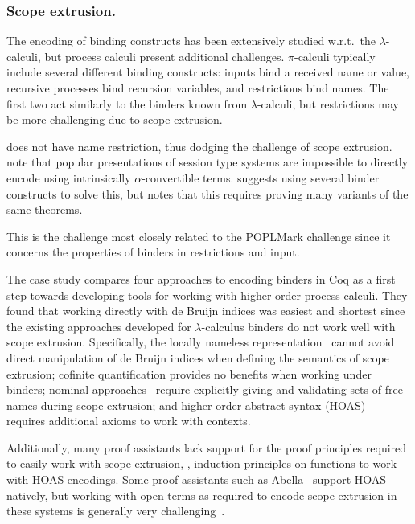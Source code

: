 \documentclass[runningheads]{llncs}
\begin{document}
\subsubsection{Scope extrusion.}

The encoding of binding constructs has been extensively studied
w.r.t.\ the $\lambda$-calculi, but process calculi present additional
challenges.  $\pi$-calculi typically include several different binding
constructs: inputs bind a received name or value, recursive processes
bind recursion variables, and restrictions bind names.  The first two
act similarly to the binders known from $\lambda$-calculi, but
restrictions may be more challenging due to scope extrusion.

\cite{Maksimovic2015} does not have name restriction, thus dodging the challenge of scope extrusion.
\cite{Castro-Perez2021,Castro2020} note that popular presentations of session type systems are impossible to directly encode using intrinsically \(\alpha\)-convertible terms.
\cite{Castro2020} suggests using several binder constructs to solve this, but notes that this requires proving many variants of the same theorems.


This is the challenge most closely related to the POPLMark challenge
since it concerns the properties of binders in restrictions and input.

The case study \cite{AmbalLS21} compares four approaches to encoding binders in Coq as a first step towards developing tools for working with higher-order process calculi.
They found that working directly with de Bruijn indices was easiest and shortest since the existing approaches developed for $\lambda$-calculus binders do not work well with scope extrusion.
Specifically, the locally nameless representation~\cite{Chargueraud2012} cannot avoid direct manipulation of de Bruijn indices when defining the semantics of scope extrusion; cofinite quantification provides no benefits when working under binders; nominal approaches~\cite{Pitts2003} require explicitly giving and validating sets of free names during scope extrusion; and higher-order abstract syntax (HOAS)~\cite{Pfenning1988} requires additional axioms to work with contexts.

Additionally, many proof assistants lack support for the proof principles required to easily work with scope extrusion, \ie, induction principles on functions to work with HOAS encodings.
Some proof assistants such as Abella~\cite{Baelde2014} support HOAS natively, but working with open terms as required to encode scope extrusion in these systems is generally very challenging~\cite{Momigliano2012}.
\end{document}
